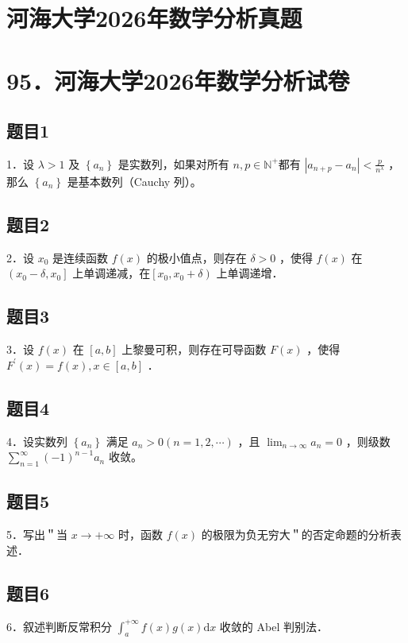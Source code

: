 \documentclass{article}
\begin{document}
\section*{河海大学2026年数学分析真题}
\section*{95．河海大学2026年数学分析试卷}

\subsection{题目1}
1．设 \(\lambda>1\) 及 \(\left\{a_{n}\right\}\) 是实数列，如果对所有 \(n, p \in \mathbb{N}^{+}\)都有 \(\left|a_{n+p}-a_{n}\right|<\frac{p}{n^{\lambda}}\) ，那么 \(\left\{a_{n}\right\}\) 是基本数列（Cauchy 列）。

\subsection{题目2}
2．设 \(x_{0}\) 是连续函数 \(f(x)\) 的极小值点，则存在 \(\delta>0\) ，使得 \(f(x)\) 在 \(\left(x_{0}-\delta, x_{0}\right]\) 上单调递减，在\(\left[x_{0}, x_{0}+\delta\right)\) 上单调递增．

\subsection{题目3}
3．设 \(f(x)\) 在 \([a, b]\) 上黎曼可积，则存在可导函数 \(F(x)\) ，使得 \(F^{\prime}(x)=f(x), x \in[a, b]\) ．

\subsection{题目4}
4．设实数列 \(\left\{a_{n}\right\}\) 满足 \(a_{n}>0(n=1,2, \cdots)\) ，且 \(\lim _{n \rightarrow \infty} a_{n}=0\) ，则级数 \(\sum_{n=1}^{\infty}(-1)^{n-1} a_{n}\) 收敛。

\subsection{题目5}
5．写出＂当 \(x \rightarrow+\infty\) 时，函数 \(f(x)\) 的极限为负无穷大＂的否定命题的分析表述．

\subsection{题目6}
6．叙述判断反常积分 \(\int_{a}^{+\infty} f(x) g(x) \mathrm{d} x\) 收敛的 Abel 判别法．
\end{document}
